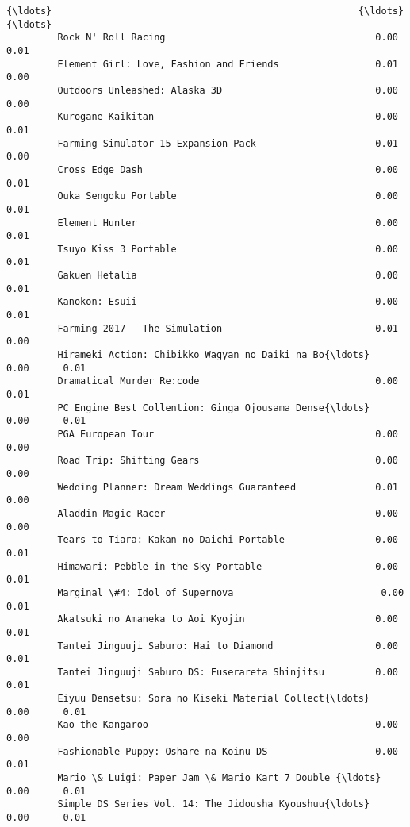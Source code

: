 \documentclass[11pt]{article}
\begin{document}
\begin{Verbatim}[commandchars=\\\{\}]
         {\ldots}                                                      {\ldots}       {\ldots}   
         Rock N' Roll Racing                                     0.00      0.01   
         Element Girl: Love, Fashion and Friends                 0.01      0.00   
         Outdoors Unleashed: Alaska 3D                           0.00      0.00   
         Kurogane Kaikitan                                       0.00      0.01   
         Farming Simulator 15 Expansion Pack                     0.01      0.00   
         Cross Edge Dash                                         0.00      0.01   
         Ouka Sengoku Portable                                   0.00      0.01   
         Element Hunter                                          0.00      0.01   
         Tsuyo Kiss 3 Portable                                   0.00      0.01   
         Gakuen Hetalia                                          0.00      0.01   
         Kanokon: Esuii                                          0.00      0.01   
         Farming 2017 - The Simulation                           0.01      0.00   
         Hirameki Action: Chibikko Wagyan no Daiki na Bo{\ldots}      0.00      0.01   
         Dramatical Murder Re:code                               0.00      0.01   
         PC Engine Best Collention: Ginga Ojousama Dense{\ldots}      0.00      0.01   
         PGA European Tour                                       0.00      0.00   
         Road Trip: Shifting Gears                               0.00      0.00   
         Wedding Planner: Dream Weddings Guaranteed              0.01      0.00   
         Aladdin Magic Racer                                     0.00      0.00   
         Tears to Tiara: Kakan no Daichi Portable                0.00      0.01   
         Himawari: Pebble in the Sky Portable                    0.00      0.01   
         Marginal \#4: Idol of Supernova                          0.00      0.01   
         Akatsuki no Amaneka to Aoi Kyojin                       0.00      0.01   
         Tantei Jinguuji Saburo: Hai to Diamond                  0.00      0.01   
         Tantei Jinguuji Saburo DS: Fuserareta Shinjitsu         0.00      0.01   
         Eiyuu Densetsu: Sora no Kiseki Material Collect{\ldots}      0.00      0.01   
         Kao the Kangaroo                                        0.00      0.00   
         Fashionable Puppy: Oshare na Koinu DS                   0.00      0.01   
         Mario \& Luigi: Paper Jam \& Mario Kart 7 Double {\ldots}      0.00      0.01   
         Simple DS Series Vol. 14: The Jidousha Kyoushuu{\ldots}      0.00      0.01   
         

\end{Verbatim}
\end{document}
